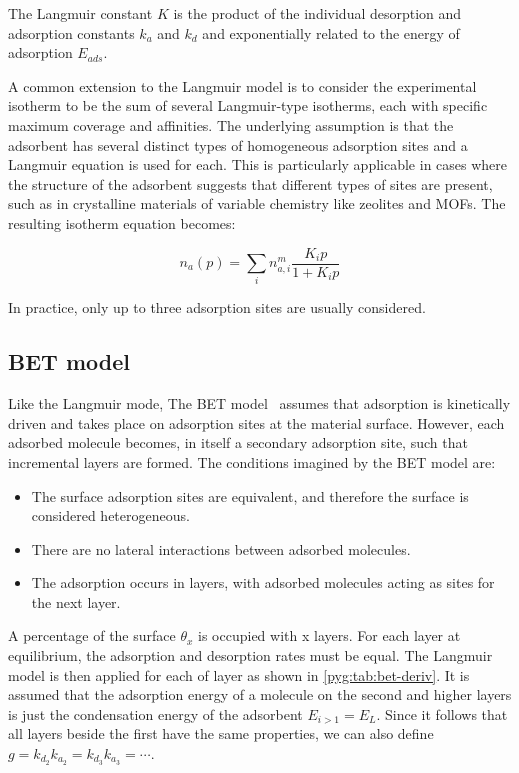 The Langmuir constant \(K\) is the product of the individual
desorption and adsorption constants \(k_a\) and \(k_d\) and exponentially
related to the energy of adsorption \(E_{ads}\).

A common extension to the Langmuir model is to consider
the experimental isotherm to be the sum of several Langmuir-type
isotherms, each with specific maximum coverage and affinities.
The underlying assumption is that the adsorbent has several distinct
types of homogeneous adsorption sites and a Langmuir
equation is used for each. This is particularly
applicable in cases where the structure of the adsorbent
suggests that different types of sites are present,
such as in crystalline materials of variable chemistry like
zeolites and MOFs. The resulting isotherm equation becomes:

\begin{equation}\label{pyg:eqn:langmulti}
	n_a(p) = \sum_i n_{a,i}^m\frac{K_i p}{1+K_i p}
\end{equation}

In practice, only up to three adsorption sites are usually
considered.

\subsection{BET model}\label{pyg:models:bet}

Like the Langmuir mode, The BET model~\cite{brunauerAdsorptionGasesMultimolecular1938}
assumes that adsorption is kinetically driven and takes place on adsorption
sites at the material surface. However, each adsorbed molecule becomes,
in itself a secondary adsorption site, such that incremental layers
are formed. The conditions imagined by the BET model are:

\begin{itemize}
	\item The surface adsorption sites are equivalent, and therefore the
	      surface is considered heterogeneous.
	\item There are no lateral interactions between adsorbed
		  molecules.
	\item The adsorption occurs in layers, with adsorbed
	      molecules acting as sites for the next layer.
\end{itemize}

A percentage of the surface \(\theta_x\) is occupied with
x layers. For each layer at equilibrium, the adsorption and
desorption rates must be equal.
The Langmuir model is then applied for each of layer
as shown in \autoref{pyg:tab:bet-deriv}. It is assumed
that the adsorption energy of a molecule on the second
and higher layers is just the condensation energy of the
adsorbent \(E_{i>1} = E_L\). Since it follows that
all layers beside the first have the same properties,
we can also define \(g= {k_{d_2}}{k_{a_2}} = {k_{d_3}}{k_{a_3}} =
\cdots\).

